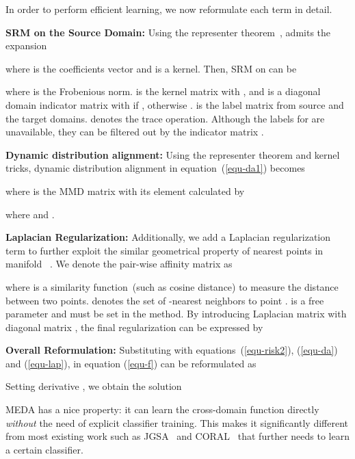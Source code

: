 \documentclass[sigconf]{acmart}
\begin{document}
In order to perform efficient learning, we now reformulate each term in detail.

\textbf{SRM on the Source Domain:} 
Using the representer theorem~\cite{belkin2006manifold},  admits the expansion 

where  is the coefficients vector and  is a kernel. Then, SRM on  can be

where  is the Frobenious norm.  is the kernel matrix with , and  is a diagonal domain indicator matrix with  if , otherwise .  is the label matrix from source and the target domains.  denotes the trace operation. Although the labels for  are unavailable, they can be filtered out by the indicator matrix .

\textbf{Dynamic distribution alignment: }
Using the representer theorem and kernel tricks, dynamic distribution alignment in equation~(\ref{equ-da1}) becomes

where  is the MMD matrix with its element calculated by


where  and .

\textbf{Laplacian Regularization: } 
Additionally, we add a Laplacian regularization term to further exploit the similar geometrical property of nearest points in manifold ~\cite{belkin2006manifold}. We denote the pair-wise affinity matrix as

where  is a similarity function~(such as cosine distance) to measure the distance between two points.  denotes the set of -nearest neighbors to point .  is a free parameter and must be set in the method. By introducing Laplacian matrix  with diagonal matrix , the final regularization can be expressed by


\textbf{Overall Reformulation:} Substituting with equations~(\ref{equ-risk2}), (\ref{equ-da}) and (\ref{equ-lap}),  in equation (\ref{equ-f}) can be reformulated as

Setting derivative , we obtain the solution 


MEDA has a nice property: it can learn the cross-domain function directly \textit{without} the need of explicit classifier training. This makes it significantly different from most existing work such as JGSA~\cite{zhang2017joint} and CORAL~\cite{sun2016return} that further needs to learn a certain classifier.
\end{document}
